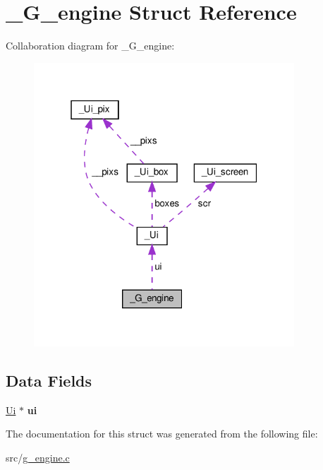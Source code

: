 \hypertarget{struct__G__engine}{}\section{\+\_\+\+G\+\_\+engine Struct Reference}
\label{struct__G__engine}


Collaboration diagram for \+\_\+\+G\+\_\+engine\+:\nopagebreak
\begin{figure}[H]
\begin{center}
\leavevmode
\includegraphics[width=277pt]{struct__G__engine__coll__graph}
\end{center}
\end{figure}
\subsection*{Data Fields}
\begin{DoxyCompactItemize}
\item 
\mbox{\label{struct__G__engine_abf87df76723f99d4d39a4d5f629777cb}} 
\hyperlink{struct__Ui}{Ui} $\ast$ {\bfseries ui}
\end{DoxyCompactItemize}


The documentation for this struct was generated from the following file\+:\begin{DoxyCompactItemize}
\item 
src/\hyperlink{g__engine_8c}{g\+\_\+engine.\+c}\end{DoxyCompactItemize}
